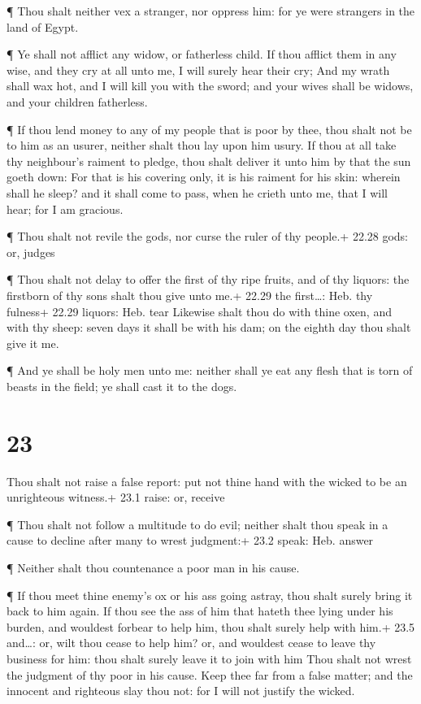  ¶ Thou shalt neither vex a stranger, nor oppress him: for
ye were strangers in the land of Egypt.

 ¶ Ye shall not afflict any widow, or fatherless child.
 If thou afflict them in any wise, and they cry at all unto
me, I will surely hear their cry;  And my wrath shall wax
hot, and I will kill you with the sword; and your wives shall be widows,
and your children fatherless.

 ¶ If thou lend money to any of my people that is poor by
thee, thou shalt not be to him as an usurer, neither shalt thou lay upon
him usury.  If thou at all take thy neighbour's raiment to
pledge, thou shalt deliver it unto him by that the sun goeth down:
 For that is his covering only, it is his raiment for his
skin: wherein shall he sleep? and it shall come to pass, when he crieth
unto me, that I will hear; for I am gracious.

 ¶ Thou shalt not revile the gods, nor curse the ruler of
thy people.+ 22.28 gods: or, judges

 ¶ Thou shalt not delay to offer the first of thy ripe
fruits, and of thy liquors: the firstborn of thy sons shalt thou give
unto me.+ 22.29 the first\ldots: Heb. thy fulness+ 22.29 liquors: Heb.
tear  Likewise shalt thou do with thine oxen, and with thy
sheep: seven days it shall be with his dam; on the eighth day thou shalt
give it me.

 ¶ And ye shall be holy men unto me: neither shall ye eat
any flesh that is torn of beasts in the field; ye shall cast it to the
dogs.

\hypertarget{section-22}{%
\section{23}\label{section-22}}

 Thou shalt not raise a false report: put not thine hand
with the wicked to be an unrighteous witness.+ 23.1 raise: or, receive

 ¶ Thou shalt not follow a multitude to do evil; neither
shalt thou speak in a cause to decline after many to wrest judgment:+
23.2 speak: Heb. answer

 ¶ Neither shalt thou countenance a poor man in his cause.

 ¶ If thou meet thine enemy's ox or his ass going astray,
thou shalt surely bring it back to him again.  If thou see
the ass of him that hateth thee lying under his burden, and wouldest
forbear to help him, thou shalt surely help with him.+ 23.5 and\ldots:
or, wilt thou cease to help him? or, and wouldest cease to leave thy
business for him: thou shalt surely leave it to join with him
 Thou shalt not wrest the judgment of thy poor in his cause.
 Keep thee far from a false matter; and the innocent and
righteous slay thou not: for I will not justify the wicked.

